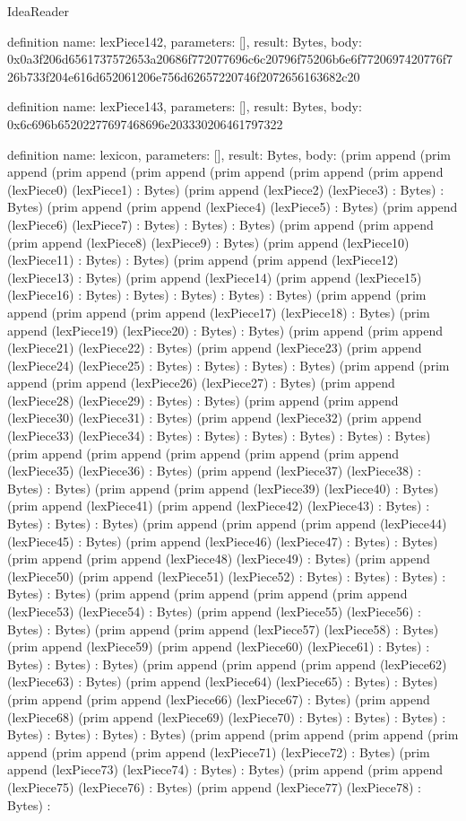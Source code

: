 \begin{lexlean}{IdeaReader}
\begin{semanticmodule}
definition{
  name: lexPiece142,
  parameters: [],
  result: Bytes,
  body: 0x0a3f206d6561737572653a20686f772077696c6c20796f75206b6e6f7720697420776f726b733f204e616d652061206e756d62657220746f2072656163682c20
}

definition{
  name: lexPiece143,
  parameters: [],
  result: Bytes,
  body: 0x6c696b65202277697468696e203330206461797322
}

definition{
  name: lexicon,
  parameters: [],
  result: Bytes,
  body: (prim append (prim append (prim append (prim append (prim append (prim append (prim append (lexPiece0) (lexPiece1) : Bytes) (prim append (lexPiece2) (lexPiece3) : Bytes) : Bytes) (prim append (prim append (lexPiece4) (lexPiece5) : Bytes) (prim append (lexPiece6) (lexPiece7) : Bytes) : Bytes) : Bytes) (prim append (prim append (prim append (lexPiece8) (lexPiece9) : Bytes) (prim append (lexPiece10) (lexPiece11) : Bytes) : Bytes) (prim append (prim append (lexPiece12) (lexPiece13) : Bytes) (prim append (lexPiece14) (prim append (lexPiece15) (lexPiece16) : Bytes) : Bytes) : Bytes) : Bytes) : Bytes) (prim append (prim append (prim append (prim append (lexPiece17) (lexPiece18) : Bytes) (prim append (lexPiece19) (lexPiece20) : Bytes) : Bytes) (prim append (prim append (lexPiece21) (lexPiece22) : Bytes) (prim append (lexPiece23) (prim append (lexPiece24) (lexPiece25) : Bytes) : Bytes) : Bytes) : Bytes) (prim append (prim append (prim append (lexPiece26) (lexPiece27) : Bytes) (prim append (lexPiece28) (lexPiece29) : Bytes) : Bytes) (prim append (prim append (lexPiece30) (lexPiece31) : Bytes) (prim append (lexPiece32) (prim append (lexPiece33) (lexPiece34) : Bytes) : Bytes) : Bytes) : Bytes) : Bytes) : Bytes) (prim append (prim append (prim append (prim append (prim append (lexPiece35) (lexPiece36) : Bytes) (prim append (lexPiece37) (lexPiece38) : Bytes) : Bytes) (prim append (prim append (lexPiece39) (lexPiece40) : Bytes) (prim append (lexPiece41) (prim append (lexPiece42) (lexPiece43) : Bytes) : Bytes) : Bytes) : Bytes) (prim append (prim append (prim append (lexPiece44) (lexPiece45) : Bytes) (prim append (lexPiece46) (lexPiece47) : Bytes) : Bytes) (prim append (prim append (lexPiece48) (lexPiece49) : Bytes) (prim append (lexPiece50) (prim append (lexPiece51) (lexPiece52) : Bytes) : Bytes) : Bytes) : Bytes) : Bytes) (prim append (prim append (prim append (prim append (lexPiece53) (lexPiece54) : Bytes) (prim append (lexPiece55) (lexPiece56) : Bytes) : Bytes) (prim append (prim append (lexPiece57) (lexPiece58) : Bytes) (prim append (lexPiece59) (prim append (lexPiece60) (lexPiece61) : Bytes) : Bytes) : Bytes) : Bytes) (prim append (prim append (prim append (lexPiece62) (lexPiece63) : Bytes) (prim append (lexPiece64) (lexPiece65) : Bytes) : Bytes) (prim append (prim append (lexPiece66) (lexPiece67) : Bytes) (prim append (lexPiece68) (prim append (lexPiece69) (lexPiece70) : Bytes) : Bytes) : Bytes) : Bytes) : Bytes) : Bytes) : Bytes) (prim append (prim append (prim append (prim append (prim append (prim append (lexPiece71) (lexPiece72) : Bytes) (prim append (lexPiece73) (lexPiece74) : Bytes) : Bytes) (prim append (prim append (lexPiece75) (lexPiece76) : Bytes) (prim append (lexPiece77) (lexPiece78) : Bytes) : }
\end{semanticmodule}
\end{lexlean}
